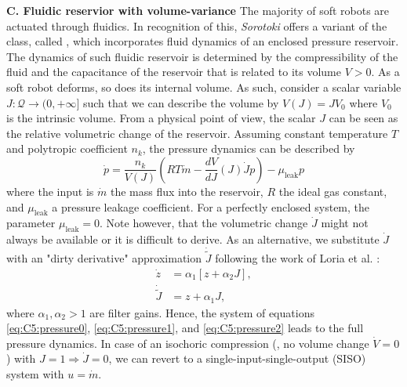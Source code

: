 \textbf{C. Fluidic reservior with volume-variance}
The majority of soft robots are actuated through fluidics. In recognition of this, \textit{Sorotoki} offers a variant of the  class, called , which incorporates fluid dynamics of an enclosed pressure reservoir. The dynamics of such fluidic reservoir is determined by the compressibility of the fluid and the capacitance of the reservoir that is related to its volume $V > 0$. As a soft robot deforms, so does its internal volume. As such, consider a scalar variable $J: \mathcal{Q} \to (0,+\infty]$ such that we can describe the volume by $V(J) = J V_0$ where $V_0$ is the intrinsic volume. From a physical point of view, the scalar $J$ can be seen as the relative volumetric change of the reservoir. Assuming constant temperature $T$ and polytropic coefficient $n_k$, the pressure dynamics can be described by
%
\begin{equation}
    \dot{p} = \frac{n_k}{V(J)} \left( R T \dot{m} - \frac{d V}{d J}(J) \dot{J} p \right) - \mu_{\textrm{leak}} p
    \label{eq:C5:pressure0}
\end{equation}
%
where the input is $\dot{m}$ the mass flux into the reservoir, $R$ the ideal gas constant, and $\mu_{\textrm{leak}}$ a pressure leakage coefficient. For a perfectly enclosed system, the parameter $\mu_{\textrm{leak}} = 0$. Note however, that the volumetric change $\dot{J}$ might not always be available or it is difficult to derive. As an alternative, we substitute $\dot{J}$ with an "dirty derivative" approximation $\dot{\tilde{J}}$ following the work of Loria et al. \cite{Loria2015Jun}:
%
\begin{align}
    \dot{z}         & = \alpha_1 [z + \alpha_2 J ], \label{eq:C5:pressure1}\\
    \dot{\tilde{J}} & = z + \alpha_1 J, \label{eq:C5:pressure2}
\end{align}
%
where $\alpha_1,\alpha_2> 1$ are filter gains. Hence, the system of equations \eqref{eq:C5:pressure0}, \eqref{eq:C5:pressure1}, and \eqref{eq:C5:pressure2} leads to the full pressure dynamics. In case of an isochoric compression (\ie, no volume change $\dot{V} = 0$) with $J = 1 \Rightarrow \dot{J} = 0$, we can revert to a single-input-single-output (SISO) system with $u = \dot{m}$.

